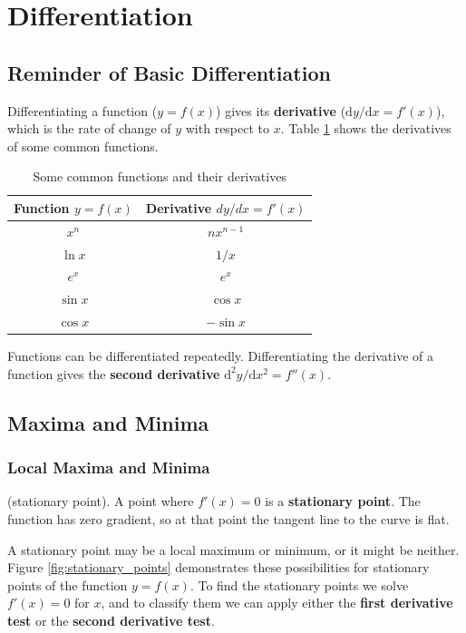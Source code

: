 \section{Differentiation}

\subsection{Reminder of Basic Differentiation}

Differentiating a function ($y = f(x)$) gives its \textbf{derivative} ($\mathrm{d}y/\mathrm{d}x = f'(x)$), which is the rate of change of $y$ with respect to $x$. Table \ref{tab:derivatives} shows the derivatives of some common functions.

\begin{table}[ht]
    \centering
    \begin{tabular}{|c|c|} \hline
    Function $y = f(x)$ & Derivative $dy/dx = f'(x)$ \\ \hline
    $x^n$ & $nx^{n-1}$\\
    $\ln x$ & $1/x$\\
    $e^x$ & $e^x$\\
    $\sin x$ & $\cos x$\\
    $\cos x$ & $-\sin x$\\\hline
    \end{tabular}
    \caption{Some common functions and their derivatives}
    \label{tab:derivatives}
\end{table}

Functions can be differentiated repeatedly. Differentiating the derivative of a function gives the \textbf{second derivative} $\mathrm{d}^2y/\mathrm{d}x^2 = f''(x)$.

\newpage
\subsection{Maxima and Minima}

\subsubsection{Local Maxima and Minima}

\begin{definition}
    (stationary point). A point where $f'(x) = 0$ is a \textbf{stationary point}. The function has zero gradient, so at that point the tangent line to the curve is flat.
\end{definition}

A stationary point may be a local maximum or minimum, or it might be neither. Figure \ref{fig:stationary_points} demonstrates these possibilities for stationary points of the function $y=f(x)$. To find the stationary points we solve $f'(x) = 0$ for $x$, and to classify them we can apply either the \textbf{first derivative test} or the \textbf{second derivative test}.

